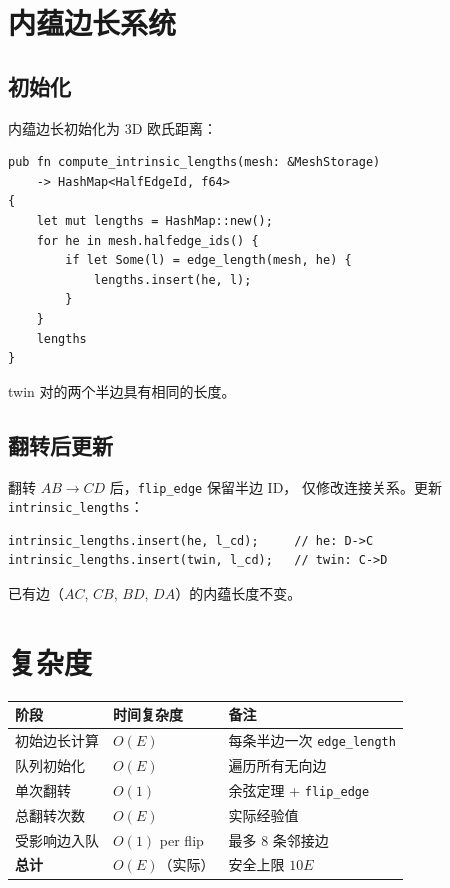 \documentclass[11pt,a4paper]{article}
\begin{document}
\section{内蕴边长系统}

\subsection{初始化}

内蕴边长初始化为 3D 欧氏距离：
\begin{lstlisting}
pub fn compute_intrinsic_lengths(mesh: &MeshStorage)
    -> HashMap<HalfEdgeId, f64>
{
    let mut lengths = HashMap::new();
    for he in mesh.halfedge_ids() {
        if let Some(l) = edge_length(mesh, he) {
            lengths.insert(he, l);
        }
    }
    lengths
}
\end{lstlisting}

twin 对的两个半边具有相同的长度。

\subsection{翻转后更新}

翻转 $AB \to CD$ 后，\texttt{flip\_edge} 保留半边 ID，
仅修改连接关系。更新 \texttt{intrinsic\_lengths}：
\begin{lstlisting}
intrinsic_lengths.insert(he, l_cd);     // he: D->C
intrinsic_lengths.insert(twin, l_cd);   // twin: C->D
\end{lstlisting}

已有边（$AC$, $CB$, $BD$, $DA$）的内蕴长度不变。

\section{复杂度}

\begin{center}
\renewcommand{\arraystretch}{1.18}
\begin{tabular}{@{}lll@{}}
  \toprule
  \textbf{阶段} & \textbf{时间复杂度} & \textbf{备注} \\
  \midrule
  初始边长计算     & $O(E)$              & 每条半边一次 \texttt{edge\_length} \\
  队列初始化       & $O(E)$              & 遍历所有无向边 \\
  单次翻转         & $O(1)$              & 余弦定理 + \texttt{flip\_edge} \\
  总翻转次数       & $O(E)$              & 实际经验值 \\
  受影响边入队     & $O(1)$ per flip     & 最多 8 条邻接边 \\
  \midrule
  \textbf{总计}   & $O(E)$（实际）      & 安全上限 $10E$ \\
  \bottomrule
\end{tabular}
\end{center}
\end{document}
